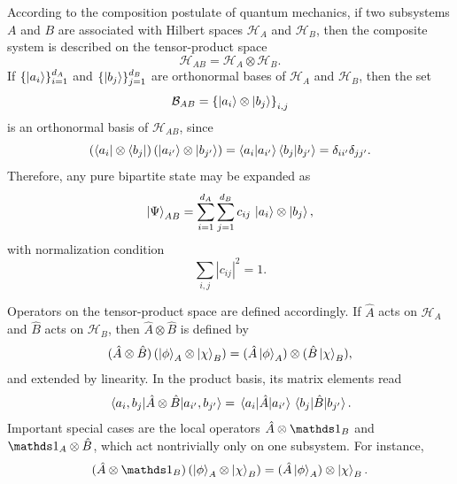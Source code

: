According to the composition postulate of quantum mechanics, if two subsystems $A$ and $B$ are associated with Hilbert spaces $\mathcal{H}_A$ and $\mathcal{H}_B$, then the composite system is described on the tensor-product space
\begin{equation}
	\mathcal{H}_{AB}=\mathcal{H}_A\otimes\mathcal{H}_B.
	\label{eq:intro_qm_tensor_product_hilbert_space}
\end{equation}
If $\{\ket{a_i}\}_{i=1}^{d_A}$ and $\{\ket{b_j}\}_{j=1}^{d_B}$ are orthonormal bases of $\mathcal{H}_A$ and $\mathcal{H}_B$, then the set
\begin{equation}
	\mathcal{B}_{AB}=\left\{\ket{a_i}\otimes\ket{b_j}\right\}_{i,j}
	\label{eq:intro_qm_product_basis_definition}
\end{equation}
is an orthonormal basis of $\mathcal{H}_{AB}$, since
\begin{equation}
	\left(\bra{a_i}\otimes\bra{b_j}\right)\left(\ket{a_{i'}}\otimes\ket{b_{j'}}\right)
	=
	\braket{a_i}{a_{i'}}\braket{b_j}{b_{j'}}
	=
	\delta_{ii'}\delta_{jj'}.
	\label{eq:intro_qm_product_basis_orthonormality}
\end{equation}
Therefore, any pure bipartite state may be expanded as
\begin{equation}
	\ket{\Psi}_{AB}
	=
	\sum_{i=1}^{d_A}\sum_{j=1}^{d_B} c_{ij}\,\ket{a_i}\otimes\ket{b_j},
	\label{eq:intro_qm_generic_bipartite_pure_state}
\end{equation}
with normalization condition
\begin{equation}
	\sum_{i,j}|c_{ij}|^2=1.
	\label{eq:intro_qm_generic_bipartite_pure_state_normalization}
\end{equation}

Operators on the tensor-product space are defined accordingly. If $\hat A$ acts on $\mathcal{H}_A$ and $\hat B$ acts on $\mathcal{H}_B$, then $\hat A\otimes \hat B$ is defined by
\begin{equation}
	(\hat A\otimes \hat B)\left(\ket{\phi}_A\otimes\ket{\chi}_B\right)
	=
	(\hat A\ket{\phi}_A)\otimes(\hat B\ket{\chi}_B),
	\label{eq:intro_qm_tensor_product_operator_action}
\end{equation}
and extended by linearity. In the product basis, its matrix elements read
\begin{equation}
	\matrixel{a_i,b_j}{\hat A\otimes \hat B}{a_{i'},b_{j'}}
	=
	\matrixel{a_i}{\hat A}{a_{i'}}\matrixel{b_j}{\hat B}{b_{j'}}.
	\label{eq:intro_qm_tensor_product_operator_matrix_elements}
\end{equation}
Important special cases are the local operators $\hat A\otimes \id_B$ and $\id_A\otimes \hat B$, which act nontrivially only on one subsystem. For instance,
\begin{equation}
	(\hat A\otimes \id_B)\left(\ket{\phi}_A\otimes\ket{\chi}_B\right)
	=
	(\hat A\ket{\phi}_A)\otimes\ket{\chi}_B.
	\label{eq:intro_qm_local_operator_action}
\end{equation}

